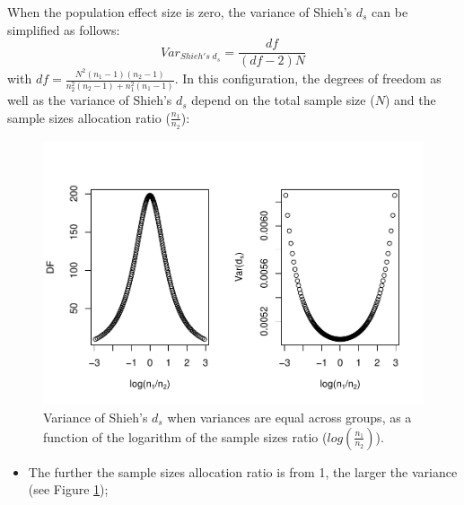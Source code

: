\documentclass[
  english,
  man,mask]{apa6}
\providecommand{\tightlist}{%
  \setlength{\itemsep}{0pt}\setlength{\parskip}{0pt}}
\begin{document}
When the population effect size is zero, the variance of Shieh's \(d_s\) can be simplified as follows:
\[Var_{Shieh's \; d_s} = \frac{df}{(df-2)N}\]
with \(df = \frac{N^2(n_1-1)(n_2-1)}{n_2^2(n_2-1)+n_1^2(n_1-1)}\). In this configuration, the degrees of freedom as well as the variance of Shieh's \(d_s\) depend on the total sample size (\(N\)) and the sample sizes allocation ratio (\(\frac{n_1}{n_2}\)):

\begin{figure}
\centering
\includegraphics{Theoretical-Variance-of-all-estimators-as-a-function-of-population-parameters_files/figure-latex/varshiehHomNratio2-1.pdf}
\caption{\label{fig:varshiehHomNratio2}Variance of Shieh's \(d_s\) when variances are equal across groups, as a function of the logarithm of the sample sizes ratio (\(log\left(\frac{n_1}{n_2} \right)\)).}
\end{figure}

\begin{itemize}
\tightlist
\item
  The further the sample sizes allocation ratio is from 1, the larger the variance (see Figure \ref{fig:varshiehHomNratio2});
\end{itemize}
\end{document}
